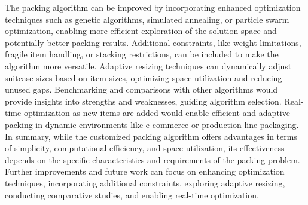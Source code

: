 \documentclass[12pt]{article}
\begin{document}
The packing algorithm can be improved by incorporating enhanced optimization techniques such as genetic algorithms, simulated annealing, or particle swarm optimization, enabling more efficient exploration of the solution space and potentially better packing results. Additional constraints, like weight limitations, fragile item handling, or stacking restrictions, can be included to make the algorithm more versatile. Adaptive resizing techniques can dynamically adjust suitcase sizes based on item sizes, optimizing space utilization and reducing unused gaps. Benchmarking and comparisons with other algorithms would provide insights into strengths and weaknesses, guiding algorithm selection. Real-time optimization as new items are added would enable efficient and adaptive packing in dynamic environments like e-commerce or production line packaging. In summary, while the customized packing algorithm offers advantages in terms of simplicity, computational efficiency, and space utilization, its effectiveness depends on the specific characteristics and requirements of the packing problem. Further improvements and future work can focus on enhancing optimization techniques, incorporating additional constraints, exploring adaptive resizing, conducting comparative studies, and enabling real-time optimization.
\end{document}
